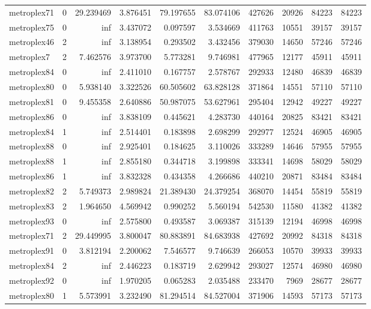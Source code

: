 \begin{longtable}{|l|r|r|r|r|r|r|r|r|r|}
metroplex71 & 0 & 29.239469 & 3.876451 & 79.197655 & 83.074106 & 427626 & 20926 & 84223 & 84223 \\
metroplex75 & 0 & inf & 3.437072 & 0.097597 & 3.534669 & 411763 & 10551 & 39157 & 39157 \\
metroplex46 & 2 & inf & 3.138954 & 0.293502 & 3.432456 & 379030 & 14650 & 57246 & 57246 \\
metroplex7 & 2 & 7.462576 & 3.973700 & 5.773281 & 9.746981 & 477965 & 12177 & 45911 & 45911 \\
metroplex84 & 0 & inf & 2.411010 & 0.167757 & 2.578767 & 292933 & 12480 & 46839 & 46839 \\
metroplex80 & 0 & 5.938140 & 3.322526 & 60.505602 & 63.828128 & 371864 & 14551 & 57110 & 57110 \\
metroplex81 & 0 & 9.455358 & 2.640886 & 50.987075 & 53.627961 & 295404 & 12942 & 49227 & 49227 \\
metroplex86 & 0 & inf & 3.838109 & 0.445621 & 4.283730 & 440164 & 20825 & 83421 & 83421 \\
metroplex84 & 1 & inf & 2.514401 & 0.183898 & 2.698299 & 292977 & 12524 & 46905 & 46905 \\
metroplex88 & 0 & inf & 2.925401 & 0.184625 & 3.110026 & 333289 & 14646 & 57955 & 57955 \\
metroplex88 & 1 & inf & 2.855180 & 0.344718 & 3.199898 & 333341 & 14698 & 58029 & 58029 \\
metroplex86 & 1 & inf & 3.832328 & 0.434358 & 4.266686 & 440210 & 20871 & 83484 & 83484 \\
metroplex82 & 2 & 5.749373 & 2.989824 & 21.389430 & 24.379254 & 368070 & 14454 & 55819 & 55819 \\
metroplex83 & 2 & 1.964650 & 4.569942 & 0.990252 & 5.560194 & 542530 & 11580 & 41382 & 41382 \\
metroplex93 & 0 & inf & 2.575800 & 0.493587 & 3.069387 & 315139 & 12194 & 46998 & 46998 \\
metroplex71 & 2 & 29.449995 & 3.800047 & 80.883891 & 84.683938 & 427692 & 20992 & 84318 & 84318 \\
metroplex91 & 0 & 3.812194 & 2.200062 & 7.546577 & 9.746639 & 266053 & 10570 & 39933 & 39933 \\
metroplex84 & 2 & inf & 2.446223 & 0.183719 & 2.629942 & 293027 & 12574 & 46980 & 46980 \\
metroplex92 & 0 & inf & 1.970205 & 0.065283 & 2.035488 & 233470 & 7969 & 28677 & 28677 \\
metroplex80 & 1 & 5.573991 & 3.232490 & 81.294514 & 84.527004 & 371906 & 14593 & 57173 & 57173 \\

\end{longtable}
